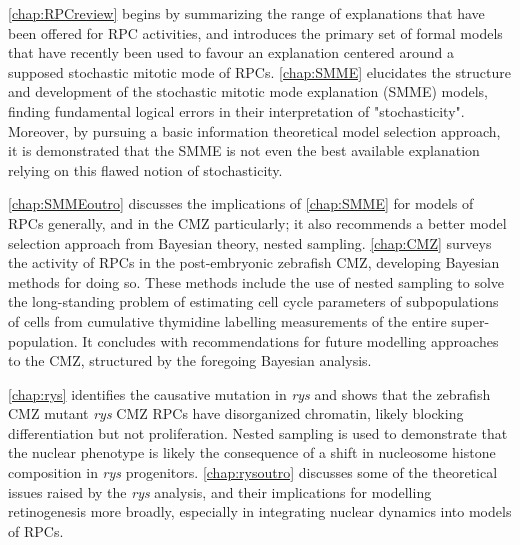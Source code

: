 \autoref{chap:RPCreview} begins by summarizing the range of explanations that have been offered for RPC activities, and introduces the primary set of formal models that have recently been used to favour an explanation centered around a supposed stochastic mitotic mode of RPCs. \autoref{chap:SMME} elucidates the structure and development of the stochastic mitotic mode explanation (SMME) models, finding fundamental logical errors in their interpretation of "stochasticity". Moreover, by pursuing a basic information theoretical model selection approach, it is demonstrated that the SMME is not even the best available explanation relying on this flawed notion of stochasticity.

\autoref{chap:SMMEoutro} discusses the implications of \autoref{chap:SMME} for models of RPCs generally, and in the CMZ particularly; it also recommends a better model selection approach from Bayesian theory, nested sampling. \autoref{chap:CMZ} surveys the activity of RPCs in the post-embryonic zebrafish CMZ, developing Bayesian methods for doing so. These methods include the use of nested sampling to solve the long-standing problem of estimating cell cycle parameters of subpopulations of cells from cumulative thymidine labelling measurements of the entire super-population. It concludes with recommendations for future modelling approaches to the CMZ, structured by the foregoing Bayesian analysis. 

 \autoref{chap:rys} identifies the causative mutation in \textit{rys} and shows that the zebrafish CMZ mutant \textit{rys} CMZ RPCs have disorganized chromatin, likely blocking differentiation but not proliferation. Nested sampling is used to demonstrate that the nuclear phenotype is likely the consequence of a shift in nucleosome histone composition in \textit{rys} progenitors. \autoref{chap:rysoutro} discusses some of the theoretical issues raised by the \textit{rys} analysis, and their implications for modelling retinogenesis more broadly, especially in integrating nuclear dynamics into models of RPCs.